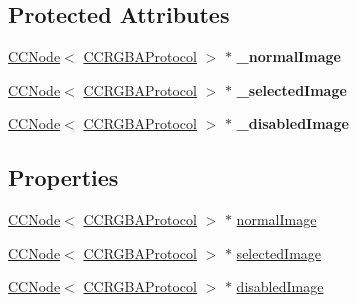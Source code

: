 \subsection*{Protected Attributes}
\begin{DoxyCompactItemize}
\item 
\hypertarget{class_c_c_menu_item_sprite_a94d194b18c28e96b3e9c849204ba4c56}{\hyperlink{class_c_c_node}{C\-C\-Node}$<$ \hyperlink{protocol_c_c_r_g_b_a_protocol-p}{C\-C\-R\-G\-B\-A\-Protocol} $>$ $\ast$ {\bfseries \-\_\-normal\-Image}}\label{class_c_c_menu_item_sprite_a94d194b18c28e96b3e9c849204ba4c56}

\item 
\hypertarget{class_c_c_menu_item_sprite_a9a5318d6b70dd002f6474e28a0f46356}{\hyperlink{class_c_c_node}{C\-C\-Node}$<$ \hyperlink{protocol_c_c_r_g_b_a_protocol-p}{C\-C\-R\-G\-B\-A\-Protocol} $>$ $\ast$ {\bfseries \-\_\-selected\-Image}}\label{class_c_c_menu_item_sprite_a9a5318d6b70dd002f6474e28a0f46356}

\item 
\hypertarget{class_c_c_menu_item_sprite_a4ee0725c61bd7a4d680e995d40ff0204}{\hyperlink{class_c_c_node}{C\-C\-Node}$<$ \hyperlink{protocol_c_c_r_g_b_a_protocol-p}{C\-C\-R\-G\-B\-A\-Protocol} $>$ $\ast$ {\bfseries \-\_\-disabled\-Image}}\label{class_c_c_menu_item_sprite_a4ee0725c61bd7a4d680e995d40ff0204}

\end{DoxyCompactItemize}
\subsection*{Properties}
\begin{DoxyCompactItemize}
\item 
\hyperlink{class_c_c_node}{C\-C\-Node}$<$ \hyperlink{protocol_c_c_r_g_b_a_protocol-p}{C\-C\-R\-G\-B\-A\-Protocol} $>$ $\ast$ \hyperlink{class_c_c_menu_item_sprite_ae38e27f26826c36a351d0edec8531265}{normal\-Image}
\item 
\hyperlink{class_c_c_node}{C\-C\-Node}$<$ \hyperlink{protocol_c_c_r_g_b_a_protocol-p}{C\-C\-R\-G\-B\-A\-Protocol} $>$ $\ast$ \hyperlink{class_c_c_menu_item_sprite_ac171832023f58cbc07e532d4b19513b7}{selected\-Image}
\item 
\hyperlink{class_c_c_node}{C\-C\-Node}$<$ \hyperlink{protocol_c_c_r_g_b_a_protocol-p}{C\-C\-R\-G\-B\-A\-Protocol} $>$ $\ast$ \hyperlink{class_c_c_menu_item_sprite_aade8cdc45d22eeb8217b354f7ecf7992}{disabled\-Image}
\end{DoxyCompactItemize}



